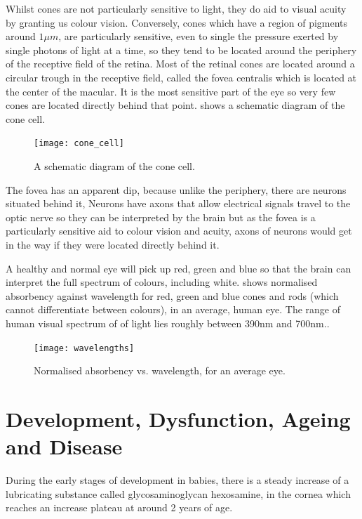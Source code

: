 Whilst cones are not particularly sensitive to light, they do aid to visual
acuity by granting us colour vision.\cite{bowmaker1980visual} Conversely, cones
which have a region of pigments around $1\mu{m}$, are particularly sensitive,
even to single the pressure exerted by single photons of light at a time,
so they tend to be located around the periphery of the receptive field of
the retina.\cite{liebman1964sensitive,baylor1979responses} 
Most of the retinal cones are located around a circular trough in the
receptive field, called the fovea centralis which is located at the center
of the macular.\cite{hendrickson1994primate} It is the most sensitive part
of the eye so very few cones are located directly behind that point.
 shows a schematic diagram of the cone cell.

\begin{figure}[!htbp]
  \centering
    \texttt{[image: cone\_cell]}
  \caption{A schematic diagram of the cone cell.}
  \label{fig:cone}
\end{figure}

The fovea has an apparent dip, because unlike the periphery,
there are neurons situated behind it, Neurons have axons that allow electrical
signals travel to the optic nerve so they can be interpreted by the brain but
as the fovea is a particularly sensitive aid to colour vision and acuity,
axons of neurons would get in the way if they were located directly behind it.

A healthy and normal eye will pick up red, green and blue so that the brain
can interpret the full spectrum of colours, including white. 
shows normalised absorbency against wavelength for red, green and blue cones
and rods (which cannot differentiate between colours), in an average, human eye.
The range of human visual spectrum of of light lies roughly between 390nm
and 700nm.\cite{starr2010biology}.

\begin{figure}[!htbp]
  \centering
    \texttt{[image: wavelengths]}
  \caption{Normalised absorbency vs. wavelength, for an average eye.}
  \label{fig:wavelengths}
\end{figure}

\section{Development, Dysfunction, Ageing and Disease}

During the early stages of development in babies, there is a steady
increase of a lubricating substance called glycosaminoglycan hexosamine,
in the cornea which reaches an increase plateau at around 2 years of age.
\cite{praus1975glycosaminoglycans}

